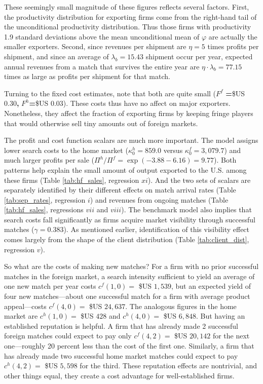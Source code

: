 \documentclass[12pt]{article}
\begin{document}
These seemingly small magnitude of these figures reflects several factors.
First, the productivity distribution for exporting firms come from the
right-hand tail of the unconditional productivity distribution. Thus those
firms with productivity 1.9 standard deviations above the mean unconditional
mean of $\varphi $ are actually the smaller exporters. Second, since
revenues per shipment are $\eta =5$ times profits per shipment, and since an
average of $\lambda _{b}=15.43$ shipment occur per year, expected annual
revenues from a match that survives the entire year are $\eta \cdot \lambda
_{b}=77.15$ times as large as profits per shipment for that match.

Turning to the fixed cost estimates, note that both are quite small ($F^{f}$%
\textbf{=}\$US 0.30\textbf{, }$F^{h}$\textbf{=}\$US 0.03). These costs thus
have no affect on major exporters. Nonetheless, they affect the fraction of
exporting firms by keeping fringe players that would otherwise sell tiny
amounts out of foreign markets.

The profit and cost function scalars are much more important. The model
assigns lower search costs to the home market ($\kappa _{0}^{h}=859.0$
versus $\kappa _{0}^{f}=3,079.7$) and much larger profits per sale ($\Pi
^{h}/\Pi ^{f}=\exp \left( -3.88-6.16\right) =9.77$). Both patterns help
explain the small amount of output exported to the U.S. among these firms
(Table \ref{tab:hf_sales}, regression $xi$). And the two sets of scalars are
separately identified by their different effects on match arrival rates
(Table \ref{tab:sep_rates}, regression $i$) and revenues from ongoing
matches (Table \ref{tab:hf_sales}, regressions $vii$ and $viii$). The
benchmark model also implies that search costs fall significantly as firms
acquire market visibility through successful matches ($\gamma =0.383$). As
mentioned earlier, identification of this visibility effect comes largely
from the shape of the client distribution (Table \ref{tab:client_dist},
regression $v$).

So what are the costs of making new matches? For a firm with no prior
successful matches in the foreign market, a search intensity sufficient to
yield an average of one new match per year costs $c^{f}(1,0)=$ \$US $1,539$, but an expected yield of four new matches---about one successful
match for a firm with average product appeal---costs $c^{f}(4,0)=$ \$US $%
24,637$. The analogous figures in the home market are $c^{h}(1,0)=$ \$US $%
428 $ and $c^{h}(4,0)=$ \$US $6,848$. But having an established reputation
is helpful. A firm that has already made 2 successful foreign matches could
expect to pay only $c^{f}(4,2)=$ \$US $20,142$ for the next
one---roughly 20 percent less than the cost of the first one. Similarly, a
firm that has already made two successful home market matches could expect
to pay $c^{h}(4,2)=$ \$US $5,598$ for the third. These reputation effects
are nontrivial, and other things equal, they create a cost advantage for
well-established firms.
\end{document}
